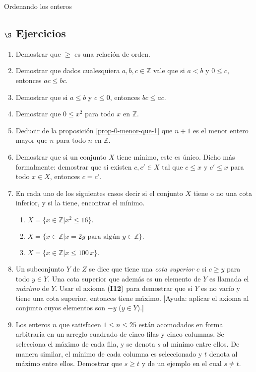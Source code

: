 \begin{section}{Ordenando los enteros}
\subsection*{\large $\S$ Ejercicios}
\begin{enumerate}
        \item Demostrar que $\ge$ es una relación de orden.
        \item Demostrar que dados cualesquiera $a,b,c \in \mathbb Z$ vale que si $a< b$ y $0\le c$, entonces $ac \le bc$. 
        \item Demostrar que si $a\le b$ y $c\le 0$, entonces $bc \le ac$.
        \item Demostrar que $0\le x^2$ para todo $x$ en $\mathbb Z$.
        \item Deducir de la proposición \ref{prop-0-menor-que-1} que $n+1$ es el menor entero mayor que $n$ para todo $n$ en $\mathbb Z$.
\item Demostrar que si un conjunto $X$ tiene mínimo, este es único. Dicho más formalmente: demostrar que si existen $c,c' \in X$ tal que  $c\le x$ y $c'\le x$ para todo $x \in X$, entonces $c=c'$. 
\item En cada uno de los siguientes casos decir
si el conjunto $X$ tiene o no una cota inferior, y si la tiene,
encontrar el mínimo.
\begin{enumerate}
    \item $X = \{x \in \mathbb Z | x^2\le 16\}.$
    \item $X =\{x \in \mathbb Z | x=2y \text{\ para algún } y \in \mathbb Z\}.$
    \item $X =\{x \in \mathbb Z | x\le 100\,x\} .$
\end{enumerate}
\item Un subconjunto $Y$ de $Z$ se dice que tiene una {\em cota superior} $c$ si $c\ge y$ para todo $y \in Y$.  Una cota superior que además es un elemento de $Y$ es llamada el {\em máximo} de $Y$. Usar el axioma (\textbf{I12}) para demostrar que si $Y$ es no vacío y tiene una cota superior, entonces tiene máximo. [Ayuda: aplicar el axioma al conjunto cuyos elementos son $-y$ ($y \in Y$).]
\item Los enteros $n$ que satisfacen $1 \le n \le 25$ están acomodados en forma arbitraria en un arreglo cuadrado de cinco filas y cinco columnas. Se selecciona el máximo  de cada fila, y se denota $s$ al mínimo entre ellos. De manera similar, el mínimo de cada columna es seleccionado y $t$ denota al máximo entre ellos. Demostrar que $s\ge t$ y de un ejemplo en el cual $s\not=t$.
\end{enumerate}

\end{section}

